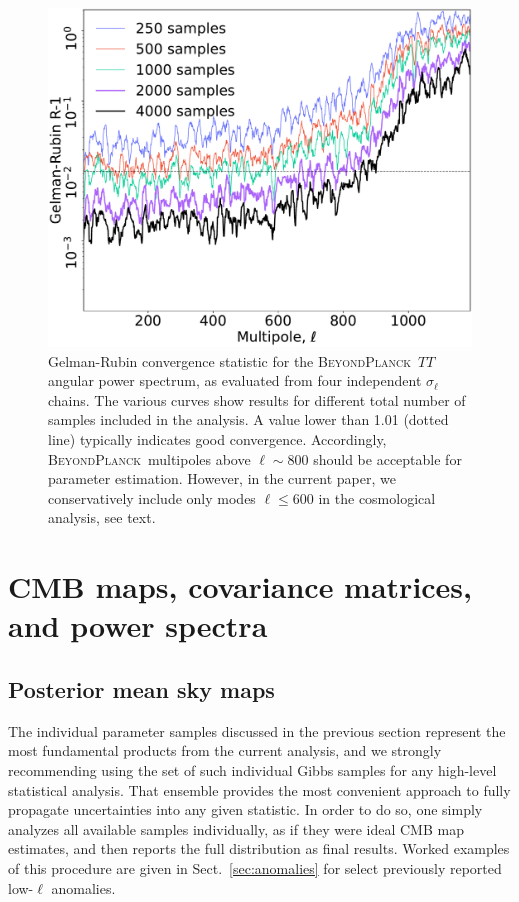 \documentclass[twocolumn]{aa}
\newcommand{\BP}{\textsc{BeyondPlanck}}
\begin{document}
\begin{figure}[t]
  \center
  \includegraphics[width=\linewidth]{figs/sigmal_GR.pdf}
  \caption{Gelman-Rubin convergence statistic for the \BP\ $TT$
    angular power spectrum, as evaluated from four independent
    $\sigma_{\ell}$ chains. The various curves show results for
    different total number of samples included in the analysis.  A
    value lower than 1.01 (dotted line) typically indicates
    good convergence. Accordingly, \BP\ multipoles above $\ell \sim 800$ should be acceptable for parameter estimation. However, in the current paper, we conservatively include only modes $\ell \le 600$ in the cosmological analysis, see text.}\label{fig:gr_TT}
\end{figure}



\section{CMB maps, covariance matrices, and power spectra}
\label{sec:maps}

\subsection{Posterior mean sky maps}

The individual parameter samples discussed in the previous section
represent the most fundamental products from the current analysis, and
we strongly recommending using the set of such individual Gibbs
samples for any high-level statistical analysis. That ensemble
provides the most convenient approach to fully propagate uncertainties
into any given statistic. In order to do so, one simply analyzes all
available samples individually, as if they were ideal CMB map
estimates, and then reports the full distribution as final results.
Worked examples of this procedure are given in
Sect.~\ref{sec:anomalies} for select previously reported low-$\ell$
anomalies. 
\end{document}
